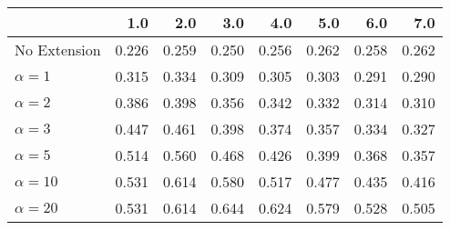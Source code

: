 \begin{tabular}{lrrrrrrr}
\toprule
{} &   1.0 &   2.0 &   3.0 &   4.0 &   5.0 &   6.0 &   7.0 \\
\midrule
No Extension  & 0.226 & 0.259 & 0.250 & 0.256 & 0.262 & 0.258 & 0.262 \\
$\alpha = 1$  & 0.315 & 0.334 & 0.309 & 0.305 & 0.303 & 0.291 & 0.290 \\
$\alpha = 2$  & 0.386 & 0.398 & 0.356 & 0.342 & 0.332 & 0.314 & 0.310 \\
$\alpha = 3$  & 0.447 & 0.461 & 0.398 & 0.374 & 0.357 & 0.334 & 0.327 \\
$\alpha = 5$  & 0.514 & 0.560 & 0.468 & 0.426 & 0.399 & 0.368 & 0.357 \\
$\alpha = 10$ & 0.531 & 0.614 & 0.580 & 0.517 & 0.477 & 0.435 & 0.416 \\
$\alpha = 20$ & 0.531 & 0.614 & 0.644 & 0.624 & 0.579 & 0.528 & 0.505 \\
\bottomrule
\end{tabular}
